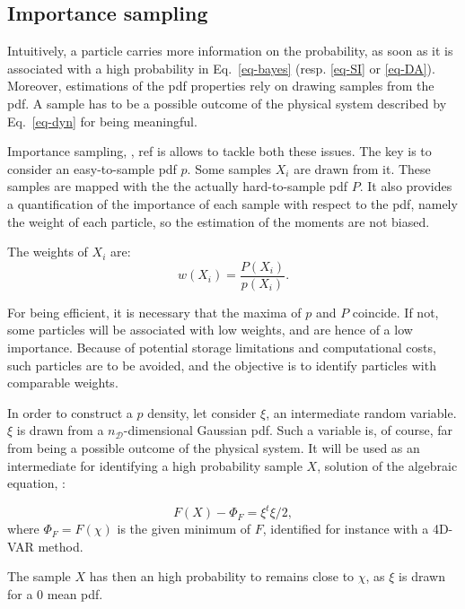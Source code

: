 \documentclass[aip,pof,nofootinbib,reprint,onecolumn]{revtex4-1}
\newcommand{\todo}[1]{{\color{red} #1 }}
\newcommand{\mypar}[1]{\left(#1\right)}
\newcommand{\Nphaz}{n_{\mathcal{D}}} %
\newcommand{\rpoint}{X}
\begin{document}
\subsection{Importance sampling}

Intuitively, a particle carries more information on the probability, as soon as it is associated with a high probability in Eq.~\eqref{eq-bayes} (resp. \eqref{eq-SI} or \eqref{eq-DA}).
Moreover, estimations of the pdf properties rely on drawing samples from the pdf. 
A sample has to be a possible outcome of the physical system described by Eq.~\eqref{eq-dyn} for being meaningful.

Importance sampling, \citep{Chorin2010,Morzfeld2012}, \todo{ref is} allows to tackle both these issues.
The key is to consider an easy-to-sample pdf $p$. Some samples $\rpoint_i$ are drawn from it. These samples are mapped with the the actually hard-to-sample pdf $P$.
It also provides a quantification of the importance of each sample with respect to the pdf, namely the weight of each particle, so the estimation of the moments are not biased.

The weights of $\rpoint_i$ are:
\begin{equation}
w\mypar{\rpoint_i} = \frac{P\mypar{\rpoint_i}}{p\mypar{\rpoint_i}}.
\label{eq-weight}
\end{equation}

For being efficient, it is necessary that the maxima of $p$ and $P$ coincide. If not, some particles will be associated with low weights, and are hence of a low importance. Because of potential storage limitations and computational costs, such particles are to be avoided, and the objective is to identify particles with comparable weights.


In order to construct a $p$ density, let consider $\xi$, an intermediate random variable. $\xi$ is drawn from a $\Nphaz$-dimensional Gaussian pdf.
Such a variable is, of course, far from being a possible outcome of the physical system.
It will be used as an intermediate for identifying a high probability sample $\rpoint$, solution of the algebraic equation, \cite{Morzfeld2012}:

\begin{equation}
F\mypar{\rpoint} - \Phi_F = \xi^t\xi/2,
\label{eq-alg}
\end{equation}
where $\Phi_F = F\mypar{\chi}$ is the given minimum of $F$, identified for instance with a 4D-VAR method.

The sample $X$ has then an high probability to remains close to $\chi$, as $\xi$ is drawn for a $0$ mean pdf. 
\end{document}
